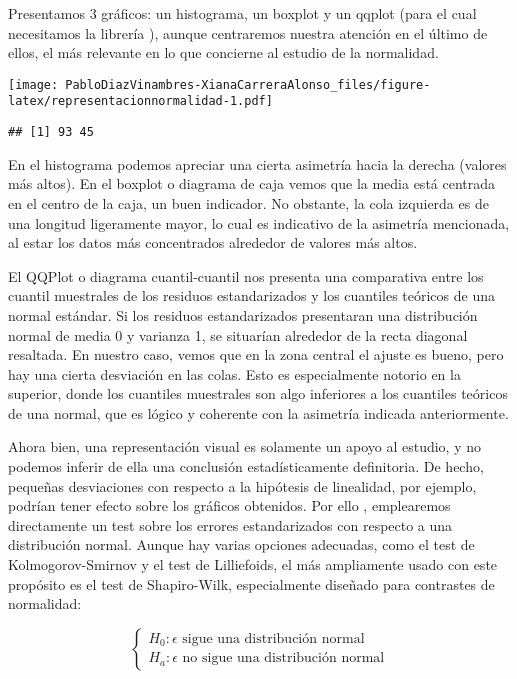 \documentclass[
]{article}
\begin{document}
Presentamos 3 gráficos: un histograma, un boxplot y un qqplot (para el
cual necesitamos la librería ), aunque centraremos nuestra
atención en el último de ellos, el más relevante en lo que concierne al
estudio de la normalidad.

\texttt{[image: PabloDiazVinambres-XianaCarreraAlonso\_files/figure-latex/representacionnormalidad-1.pdf]}

\begin{verbatim}
## [1] 93 45
\end{verbatim}

En el histograma podemos apreciar una cierta asimetría hacia la derecha
(valores más altos). En el boxplot o diagrama de caja vemos que la media
está centrada en el centro de la caja, un buen indicador. No obstante,
la cola izquierda es de una longitud ligeramente mayor, lo cual es
indicativo de la asimetría mencionada, al estar los datos más
concentrados alrededor de valores más altos.

El QQPlot o diagrama cuantil-cuantil nos presenta una comparativa entre
los cuantil muestrales de los residuos estandarizados y los cuantiles
teóricos de una normal estándar. Si los residuos estandarizados
presentaran una distribución normal de media 0 y varianza 1, se
situarían alrededor de la recta diagonal resaltada. En nuestro caso,
vemos que en la zona central el ajuste es bueno, pero hay una cierta
desviación en las colas. Esto es especialmente notorio en la superior,
donde los cuantiles muestrales son algo inferiores a los cuantiles
teóricos de una normal, que es lógico y coherente con la asimetría
indicada anteriormente.

Ahora bien, una representación visual es solamente un apoyo al estudio,
y no podemos inferir de ella una conclusión estadísticamente
definitoria. De hecho, pequeñas desviaciones con respecto a la hipótesis
de linealidad, por ejemplo, podrían tener efecto sobre los gráficos
obtenidos. Por ello , emplearemos directamente un test sobre los errores
estandarizados con respecto a una distribución normal. Aunque hay varias
opciones adecuadas, como el test de Kolmogorov-Smirnov y el test de
Lilliefoids, el más ampliamente usado con este propósito es el test de
Shapiro-Wilk, especialmente diseñado para contrastes de normalidad:

\[
\begin{cases}
H_0: \epsilon\text{ sigue una distribución normal}\\
H_a: \epsilon\text{ no sigue una distribución normal}
\end{cases}
\]
\end{document}
